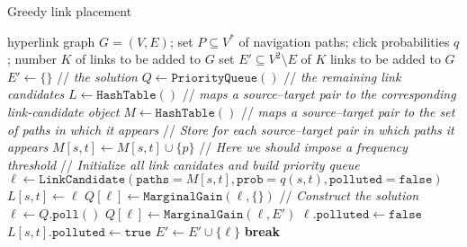 \documentclass[11pt,letterpaper]{article}
\begin{document}
\begin{algorithm}[t]
\caption{Greedy link placement}
\begin{algorithmic}[1]
\label{alg:greedy}
\INPUT hyperlink graph $G=(V,E)$; set $P \subseteq V^*$ of navigation paths; click probabilities $q$; number $K$ of links to be added to $G$
\OUTPUT set $E' \subseteq V^2 \setminus E$ of $K$ links to be added to $G$
\STATE $E' \leftarrow \{\}$ \hspace*{1mm}// \textit{the solution}
\STATE $Q \leftarrow \mathtt{PriorityQueue()}$ \hspace*{1mm}// \textit{the remaining link candidates}
\STATE $L \leftarrow \mathtt{HashTable()}$ \hspace*{1mm}// \textit{maps a source--target pair to the corresponding link-candidate object}
\STATE $M \leftarrow \mathtt{HashTable()}$ \hspace*{1mm}// \textit{maps a source--target pair to the set of paths in which it appears}
\STATE  // \textit{Store for each source--target pair in which paths it appears}
    \STATE $M[s,t] \leftarrow M[s,t] \cup \{p\}$ \hspace*{1mm}// \textit{Here we should impose a frequency threshold}
  \ENDFOR
\ENDFOR
\STATE  // \textit{Initialize all link canidates and build priority queue}
  \STATE $\ell \leftarrow \mathtt{LinkCandidate}(\mathtt{paths}=M[s,t], \mathtt{prob}=q(s,t), \mathtt{polluted}=\mathtt{false})$ %
  \STATE $L[s,t] \leftarrow \ell$
  \STATE $Q[\ell] \leftarrow \mathtt{MarginalGain}(\ell, \{\})$
\ENDFOR
\STATE  // \textit{Construct the solution}
  	\STATE $\ell \leftarrow Q.\mathtt{poll()}$
      \STATE $Q[\ell] \leftarrow \mathtt{MarginalGain}(\ell, E')$
      \STATE $\ell.\mathtt{polluted} \leftarrow \mathtt{false}$
    \ELSE
          \STATE $L[s,t].\mathtt{polluted} \leftarrow \mathtt{true}$
        \ENDFOR
      \ENDFOR
      \STATE $E' \leftarrow E' \cup \{\ell\}$
      \STATE \textbf{break}
    \ENDIF
  \ENDWHILE
\ENDFOR
\end{algorithmic}
\end{algorithm}
\end{document}
